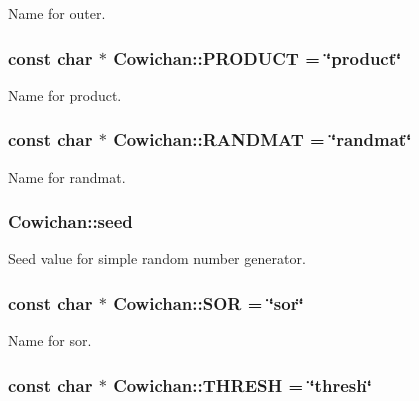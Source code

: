 Name for outer. \hypertarget{class_cowichan_57a1deea813a95ad7ed5a46dd000e576}{
\subsubsection[{PRODUCT}]{\setlength{\rightskip}{0pt plus 5cm}const char $\ast$ {\bf Cowichan::PRODUCT} = \char`\"{}product\char`\"{}}}
\label{class_cowichan_57a1deea813a95ad7ed5a46dd000e576}


Name for product. \hypertarget{class_cowichan_c9e66484bf3be07bfeac5511f514f102}{
\subsubsection[{RANDMAT}]{\setlength{\rightskip}{0pt plus 5cm}const char $\ast$ {\bf Cowichan::RANDMAT} = \char`\"{}randmat\char`\"{}}}
\label{class_cowichan_c9e66484bf3be07bfeac5511f514f102}


Name for randmat. \hypertarget{class_cowichan_e9f8e9769f15e2648435064d4286b1a6}{
\subsubsection[{seed}]{ {\bf Cowichan::seed}}}
\label{class_cowichan_e9f8e9769f15e2648435064d4286b1a6}


Seed value for simple random number generator. \hypertarget{class_cowichan_eaac49e2ebb0c5149506f0544cd87794}{
\subsubsection[{SOR}]{\setlength{\rightskip}{0pt plus 5cm}const char $\ast$ {\bf Cowichan::SOR} = \char`\"{}sor\char`\"{}}}
\label{class_cowichan_eaac49e2ebb0c5149506f0544cd87794}


Name for sor. \hypertarget{class_cowichan_e7adc012eb484f209b869db5062dacd0}{
\subsubsection[{THRESH}]{\setlength{\rightskip}{0pt plus 5cm}const char $\ast$ {\bf Cowichan::THRESH} = \char`\"{}thresh\char`\"{}}}
\label{class_cowichan_e7adc012eb484f209b869db5062dacd0}


